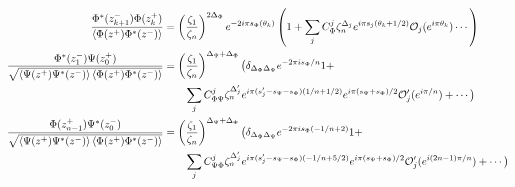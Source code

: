 \documentclass[11pt]{article}
\newcommand{\mO}{\mathcal{O}}
\newcommand{\nn}{\nonumber}
\newcommand{\lb}{\left(}
\newcommand{\rb}{\right)}
\begin{document}
  \begin{align}\label{eq: general OPE with identity}
      \frac{\Phi^*(z_{k+1}^{-})\Phi(z_k^+)}{\braket{\Phi(z^+)\Phi^*(z^-)}}&=\lb\frac{\zeta_1}{\zeta_n}\rb^{2\Delta_{\Phi}}  e^{-2i\pi s_\Phi(\theta_k)}\lb 1+ \sum_j C^{j}_{\Phi}\zeta_n^{\Delta_j} e^{i\pi s_j(\theta_k+1/2)}\mO_{j}(e^{i\pi \theta_k})\cdots\rb\nn\\
      \frac{\Phi^*(z_{1}^{-})\Psi(z_0^{+})}{\sqrt{\braket{\Psi(z^+)\Psi^*(z^-)}\braket{\Phi(z^+)\Phi^*(z^-)}}}&=\lb\frac{\zeta_1}{\zeta_n}\rb^{\Delta_\Psi + \Delta_\Phi} \big( \delta_{\Delta_{\Phi}\Delta_{\Psi}} e^{-2\pi i s_\Phi/n}1 +   \nn \\ &\qquad \sum_j C^j_{\Phi\Psi}\zeta_n^{\Delta'_j}e^{i\pi(s'_j - s_\Psi - s_\Phi)(1/n+1/2)}e^{i\pi (s_\Psi + s_\Phi)/2}\mO'_j(e^{i\pi/n}) + \cdots\big)\nn \\
      \frac{\Phi(z_{n-1}^{+})\Psi^*(z_0^{-})}{\sqrt{\braket{\Psi(z^+)\Psi^*(z^-)}\braket{\Phi(z^+)\Phi^*(z^-)}}}&= \lb\frac{\zeta_1}{\zeta_n}\rb^{\Delta_\Psi + \Delta_\Phi} \big( \delta_{\Delta_{\Phi} \Delta_{\Psi}} e^{-2\pi i s_{\Phi}(-1/n +2)}1 + \nn\\
      &\qquad \sum_j C^j_{\Psi\Phi}\zeta_n^{\Delta'_j}e^{i\pi(s'_j -s_\Psi - s_\Phi)(-1/n + 5/2)}e^{i \pi (s_\Psi + s_\Phi)/2}\mO'_j(e^{i(2n-1)\pi/n}) + \cdots\big)
  \end{align}
\end{document}
